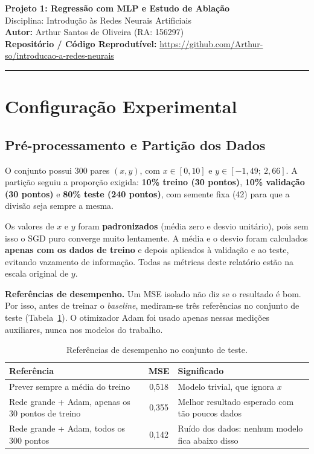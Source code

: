 \documentclass[11pt,a4paper]{article}
\begin{document}
\begin{center}
    {\LARGE \textbf{Projeto 1: Regressão com MLP e Estudo de Ablação}} \\[0.35em]
    {\large Disciplina: Introdução às Redes Neurais Artificiais} \\[0.3em]
    \textbf{Autor:} Arthur Santos de Oliveira (RA: 156297) \\[0.2em]
    \textbf{Repositório / Código Reprodutível:} \url{https://github.com/Arthur-so/introducao-a-redes-neurais}
\end{center}
\vspace{-0.5em}
\hrule
\vspace{0.8em}

\section{Configuração Experimental}

\subsection{Pré-processamento e Partição dos Dados}

O conjunto possui 300 pares $(x, y)$, com $x \in [0, 10]$ e $y \in [-1{,}49;\ 2{,}66]$. A partição seguiu a proporção exigida: \textbf{10\% treino (30 pontos)}, \textbf{10\% validação (30 pontos)} e \textbf{80\% teste (240 pontos)}, com semente fixa (42) para que a divisão seja sempre a mesma.

Os valores de $x$ e $y$ foram \textbf{padronizados} (média zero e desvio unitário), pois sem isso o SGD puro converge muito lentamente. A média e o desvio foram calculados \textbf{apenas com os dados de treino} e depois aplicados à validação e ao teste, evitando vazamento de informação. Todas as métricas deste relatório estão na escala original de $y$.

\textbf{Referências de desempenho.} Um MSE isolado não diz se o resultado é bom. Por isso, antes de treinar o \textit{baseline}, mediram-se três referências no conjunto de teste (Tabela~\ref{tab:referencias}). O otimizador Adam foi usado apenas nessas medições auxiliares, nunca nos modelos do trabalho.

\begin{table}[h]
\centering
\small
\caption{Referências de desempenho no conjunto de teste.}
\label{tab:referencias}
\begin{tabularx}{\textwidth}{XcX}
\toprule
\textbf{Referência} & \textbf{MSE} & \textbf{Significado} \\
\midrule
Prever sempre a média do treino & 0,518 & Modelo trivial, que ignora $x$ \\
Rede grande + Adam, apenas os 30 pontos de treino & 0,355 & Melhor resultado esperado com tão poucos dados \\
Rede grande + Adam, todos os 300 pontos & 0,142 & Ruído dos dados: nenhum modelo fica abaixo disso \\
\bottomrule
\end{tabularx}
\end{table}
\end{document}
